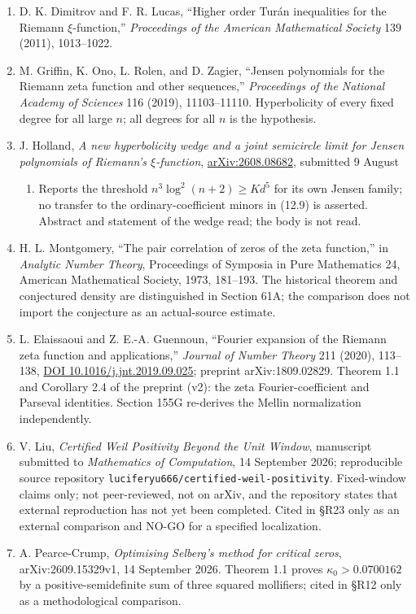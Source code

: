 \documentclass[
  11pt,
]{book}
\providecommand{\tightlist}{%
  \setlength{\itemsep}{0pt}\setlength{\parskip}{0pt}}
\begin{document}
\begin{enumerate}
  the two-part paper cited first. The characterization of Pólya
  frequency sequences used at (12.9).
\item
  D. K. Dimitrov and F. R. Lucas, ``Higher order Turán inequalities for
  the Riemann \(\xi\)-function,'' \emph{Proceedings of the American
  Mathematical Society} 139 (2011), 1013--1022.
\item
  M. Griffin, K. Ono, L. Rolen, and D. Zagier, ``Jensen polynomials for
  the Riemann zeta function and other sequences,'' \emph{Proceedings of
  the National Academy of Sciences} 116 (2019), 11103--11110.
  Hyperbolicity of every fixed degree for all large \(n\); all degrees
  for all \(n\) is the hypothesis.
\item
  J. Holland, \emph{A new hyperbolicity wedge and a joint semicircle
  limit for Jensen polynomials of Riemann's \(\xi\)-function},
  \href{https://arxiv.org/abs/2608.08682}{arXiv:2608.08682}, submitted 9
  August

  \begin{enumerate}
  \def\labelenumii{\arabic{enumii}.}
  \setcounter{enumii}{2025}
  \tightlist
  \item
    Reports the threshold \(n^3\log^2(n+2)\ge Kd^5\) for its own Jensen
    family; no transfer to the ordinary-coefficient minors in (12.9) is
    asserted. Abstract and statement of the wedge read; the body is not
    read.
  \end{enumerate}
\item
  H. L. Montgomery, ``The pair correlation of zeros of the zeta
  function,'' in \emph{Analytic Number Theory}, Proceedings of Symposia
  in Pure Mathematics 24, American Mathematical Society, 1973, 181--193.
  The historical theorem and conjectured density are distinguished in
  Section 61A; the comparison does not import the conjecture as an
  actual-source estimate.
\item
  L. Elaissaoui and Z. E.-A. Guennoun, ``Fourier expansion of the
  Riemann zeta function and applications,'' \emph{Journal of Number
  Theory} 211 (2020), 113--138,
  \href{https://doi.org/10.1016/j.jnt.2019.09.025}{DOI
  10.1016/j.jnt.2019.09.025}; preprint arXiv:1809.02829. Theorem 1.1 and
  Corollary 2.4 of the preprint (v2): the zeta Fourier-coefficient and
  Parseval identities. Section 155G re-derives the Mellin normalization
  independently.
\item
  V. Liu, \emph{Certified Weil Positivity Beyond the Unit Window},
  manuscript submitted to \emph{Mathematics of Computation}, 14
  September 2026; reproducible source repository
  \texttt{luciferyu666/certified-weil-positivity}. Fixed-window claims
  only; not peer-reviewed, not on arXiv, and the repository states that
  external reproduction has not yet been completed. Cited in §R23 only
  as an external comparison and NO-GO for a specified localization.
\item
  A. Pearce-Crump, \emph{Optimising Selberg's method for critical
  zeros}, arXiv:2609.15329v1, 14 September 2026. Theorem 1.1 proves
  \(\kappa_0>0.0700162\) by a positive-semidefinite sum of three squared
  mollifiers; cited in §R12 only as a methodological comparison.
\end{enumerate}
\end{document}

